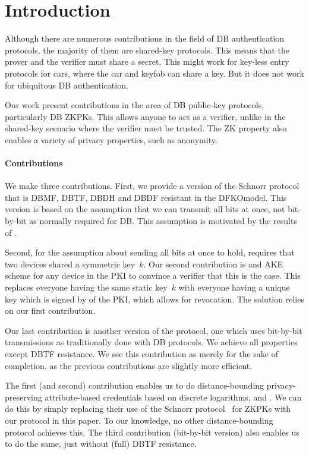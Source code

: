 \section{Introduction}%
\label{Introduction}

Although there are numerous contributions in the field of \ac{DB} 
authentication protocols, the majority of them are shared-key protocols.
This means that the prover and the verifier must share a secret.
This might work for key-less entry protocols for cars, where the car and keyfob 
can share a key.
But it does not work for ubiquitous \ac{DB} authentication.

Our work present contributions in the area of \ac{DB} public-key protocols, 
particularly \ac{DB} \acp{ZKPK}.
This allows anyone to act as a verifier, unlike in the shared-key scenario 
where the verifier must be trusted.
The \ac{ZK} property also enables a variety of privacy properties, such as 
anonymity.

\paragraph*{Contributions}

We make three contributions.
First, we provide a version of the Schnorr protocol that is \ac{DBMF}, 
\ac{DBTF}, \ac{DBDH} and \ac{DBDF} resistant in the \ac{DFKOmodel}.
This version is based on the assumption that we can transmit all bits at once, 
not bit-by-bit as normally required for \ac{DB}.
This assumption is motivated by the results of \textcite{UWBPR}.

Second, for the assumption about sending all bits at once to hold, 
\textcite{UWBPR} requires that two devices shared a symmetric key~\(k\).
Our second contribution is  and \ac{AKE} scheme for any device in 
the \ac{PKI} to convince a verifier that this is the case.
This replaces everyone having the same static key~\(k\) with everyone having a 
unique key which is signed by  of the \ac{PKI}, which allows for 
revocation.
The solution relies on our first contribution.

Our last contribution is another version of the protocol, one which uses 
bit-by-bit transmissions as traditionally done with \ac{DB} protocols.
We achieve all properties except \ac{DBTF} resistance.
We see this contribution as merely for the sake of completion, as the previous 
contributions are slightly more efficient.

The first (and second) contribution enables us to do distance-bounding 
privacy-preserving attribute-based credentials based on discrete logarithms, 
\eg \cite{Camenisch-phdthesis} and \cite{CLsignatures}.
We can do this by simply replacing their use of the Schnorr 
protocol~\cite{Schnorr} for \acp{ZKPK} with our protocol in this paper.
To our knowledge, no other distance-bounding protocol achieves this.
The third contribution (bit-by-bit version) also enables us to do the same, 
just without (full) \ac{DBTF} resistance.

